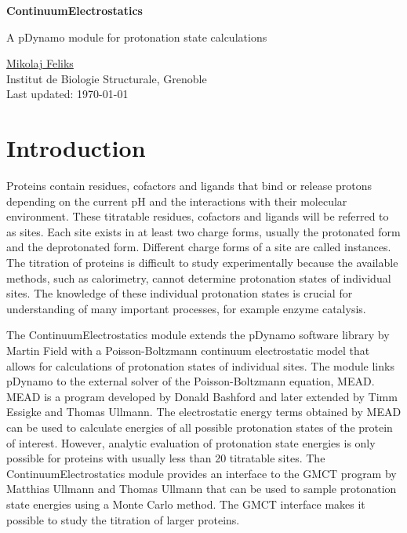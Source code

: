 \documentclass[a4paper,11pt]{article}
\newcommand{\modulename}{ContinuumElectrostatics\xspace}
\begin{document}
\begin{center}
{\LARGE \bf \modulename}

{\large
A pDynamo module for protonation state calculations

\vspace{1.0cm}
\underline{Mikolaj Feliks}\\
Institut de Biologie Structurale, Grenoble\\
Last updated: \today
}

\vspace{0.5cm}

\end{center}


\section{Introduction}
Proteins contain residues, cofactors and ligands that bind or release protons
depending on the current pH and the interactions with their molecular
environment.
%
These titratable residues, cofactors and ligands will be referred to as sites.
%
Each site exists in at least two charge forms, usually the protonated form and 
the deprotonated form.
%
Different charge forms of a site are called instances.
%
The titration of proteins is difficult to study experimentally because
the available methods, such as calorimetry, cannot determine protonation states
of individual sites.
%
The knowledge of these individual protonation states is crucial for
understanding of many important processes, for example enzyme catalysis\cite{Bombarda2010}.


The \modulename module extends the pDynamo software library by 
Martin Field\cite{pDynamo_Field2008}  with a Poisson-Boltz\-mann continuum electrostatic 
model that allows for calculations of protonation states of individual 
sites\cite{Bashford1992,Ullmann1999,Bombarda2006}.
%
The module links pDynamo to the external solver of the Poisson-Boltzmann 
equation, MEAD\cite{Bashford1997}.
%
MEAD is a program developed by Donald Bashford and 
later extended by Timm Essigke\cite{Essigke_PhD} and Thomas Ullmann\cite{Thomas_PhD}.
%
The electrostatic energy terms obtained by MEAD can be used to calculate
energies of all possible protonation states of the protein of interest.
%
However, analytic evaluation of protonation state energies is only possible
for proteins with usually less than 20 titratable sites.
%
The \modulename module provides an interface to the GMCT\cite{Ullmann2012,Thomas_PhD}
program by Matthias Ullmann and Thomas Ullmann that can be used to sample
protonation state energies using a Monte Carlo method.
%
The GMCT interface makes it possible to study the titration of larger proteins.
\end{document}
